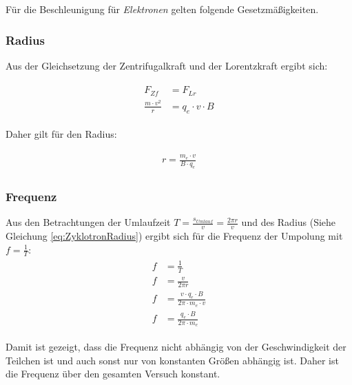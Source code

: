 Für die Beschleunigung für \emph{Elektronen} gelten folgende Gesetzmäßigkeiten.

\subsubsection{Radius}

Aus der Gleichsetzung der Zentrifugalkraft und der Lorentzkraft ergibt sich: 

\begin{align}
\begin{split}
	F_{Zf} &= F_{Lr} \\
	\frac{m \cdot v^2}{r} &= q_e \cdot v \cdot B
\end{split}
\end{align}

\noindent Daher gilt für den Radius:

\begin{align} \label{eq:ZyklotronRadius}
\begin{split}
	r = \frac{m_e \cdot v}{B \cdot q_e}
\end{split}
\end{align}


\subsubsection{Frequenz}

Aus den Betrachtungen der Umlaufzeit $T = \frac{s_{Umlauf}}{v} = \frac{2 \pi r}{v}$ und des Radius (Siehe Gleichung \ref{eq:ZyklotronRadius}) ergibt sich für die Frequenz der Umpolung mit $f=\frac{1}{T}$: \\

\begin{align}
\begin{split}
	f &= \frac{1}{T} \\
	f &= \frac{v}{2 \pi r} \\
	f &= \frac{v \cdot q_e \cdot B}{2 \pi \cdot m_e \cdot v} \\
	f &= \frac{q_e \cdot B}{2 \pi \cdot m_e}
\end{split}
\end{align}

\noindent Damit ist gezeigt, dass die Frequenz nicht abhängig von der Geschwindigkeit der Teilchen ist und auch sonst nur von konstanten Größen abhängig ist. Daher ist die Frequenz über den gesamten Versuch konstant.




